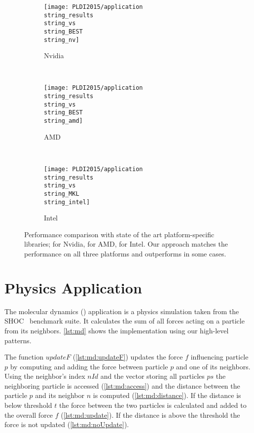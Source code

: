 \begin{figure*}[p]
  \centering
  \begin{subfigure}[b]{0.65\linewidth}
    \texttt{[image: PLDI2015/application\\string\_results\\string\_vs\\string\_BEST\\string\_nv]}
    \caption{Nvidia \GPU}
    \label{fig:linear-algebra-expr:results:nv}
  \end{subfigure}
  \\
  \begin{subfigure}[b]{0.65\linewidth}
    \texttt{[image: PLDI2015/application\\string\_results\\string\_vs\\string\_BEST\\string\_amd]}
    \caption{AMD \GPU}
    \label{fig:linear-algebra-expr:results:amd}
  \end{subfigure}
  \\
  \begin{subfigure}[b]{0.65\linewidth}
    \texttt{[image: PLDI2015/application\\string\_results\\string\_vs\\string\_MKL\\string\_intel]}
    \caption{Intel \CPU}
    \label{fig:linear-algebra-expr:results:intel}
  \end{subfigure}
  \caption[Performance comparison with state of the art platform-specific libraries]%
          {Performance comparison with state of the art platform-specific libraries; \CUBLAS for Nvidia, \clBLAS for AMD, \MKL for Intel.
           Our approach matches the performance on all three platforms and outperforms \clBLAS in some cases.
         }
   \label{fig:linear-algebra-expr:results}
\end{figure*}

\section{Physics Application}

The molecular dynamics (\MD) application is a physics simulation taken from the {\small SHOC}~\cite{DanalisMMMRSTV10} benchmark suite.
It calculates the sum of all forces acting on a particle from its neighbors.
\autoref{lst:md} shows the implementation using our high-level patterns.

The function $updateF$ (\autoref{lst:md:updateF}) updates the force $f$ influencing particle $p$ by computing and adding the force between particle $p$ and one of its neighbors.
Using the neighbor's index $nId$ and the vector storing all particles $ps$ the neighboring particle is accessed (\autoref{lst:md:access}) and the distance between the particle $p$ and its neighbor $n$ is computed (\autoref{lst:md:distance}).
If the distance is below threshold $t$ the force between the two particles is calculated and added to the overall force $f$ (\autoref{lst:md:update}).
If the distance is above the threshold the force is not updated (\autoref{lst:md:noUpdate}).

